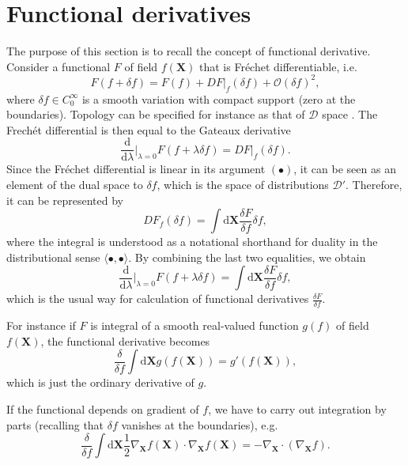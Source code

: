 \documentclass[
10pt, %
a4paper, %
oneside, %
headinclude,footinclude, %
BCOR5mm, %
]{scrartcl}
\newcommand{\XX}{\mathbf{X}}
\newcommand{\diff}{\mathrm{d}}
\newcommand{\dX}{\mathrm{d}\XX}
\newcommand{\OBig}{\mathcal{O}}
\newcommand{\Ffunc}{F}
\begin{document}
\section{Functional derivatives}\label{sec.FD}
The purpose of this section is to recall the concept of functional derivative. 
Consider a functional $\Ffunc$ of field $f(\XX)$ that is Fréchet 
differentiable, i.e. 
\begin{equation}
	\Ffunc(f+\delta f) = \Ffunc(f) +  D \Ffunc|_f (\delta f) + \OBig(\delta 
	f)^2,
\end{equation}
where $\delta f \in C^\infty_0$ is a smooth variation with compact support (zero at the boundaries). Topology can be specified for instance as that of $\mathcal{D}$ space \cite{Schwartz}.
The Frechét differential is then equal to the Gateaux derivative
\begin{equation}
	\frac{\diff}{\diff \lambda}\Big|_{\lambda = 0} \Ffunc(f+\lambda \delta f) = 
	D \Ffunc|_f (\delta f).
\end{equation}
Since the Fréchet differential is linear in its argument $(\bullet)$, it can be seen as an element of the dual space to $\delta f$, which is the space of distributions $\mathcal{D}'$. Therefore, it can be represented by 
\begin{equation}
	D \Ffunc_f(\delta f) = \int\dX \frac{\delta \Ffunc}{\delta f} \delta f,
\end{equation}
where the integral is understood as a notational shorthand for duality in the distributional sense $\langle\bullet,\bullet\rangle$. By combining the last two equalities, we obtain
\begin{equation}
	\frac{\diff}{\diff \lambda}\Big|_{\lambda = 0} \Ffunc(f+\lambda \delta f) 
	=  \int\dX \frac{\delta \Ffunc}{\delta f} \delta f,
\end{equation}
which is the usual way for calculation of functional derivatives $\frac{\delta 
\Ffunc}{\delta f}$.

For instance if $\Ffunc$ is integral of a smooth real-valued function $g(f)$ of 
field $f(\XX)$, the functional derivative becomes
\begin{equation}
	\frac{\delta}{\delta f}\int \dX g(f(\XX)) = g'(f(\XX)),
\end{equation}
which is just the ordinary derivative of $g$. 

If the functional depends on gradient of $f$, we have to carry out integration by parts (recalling that $\delta f$ vanishes at the boundaries), e.g.
\begin{equation}
	\frac{\delta}{\delta f}\int \dX \frac{1}{2}\nabla_\XX f(\XX) \cdot \nabla_\XX f(\XX) = -\nabla_\XX \cdot (\nabla_\XX f).
\end{equation}
\end{document}
